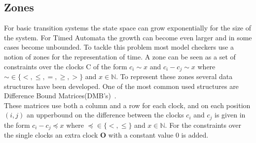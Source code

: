 \documentclass[11pt]{article}
\begin{document}
\subsection{Zones}
For basic transition systems the state space can grow exponentially for the size of the system. For Timed Automata the growth can become even larger and in some cases become unbounded. To tackle this problem most model checkers use a notion of zones for the representation of time. A zone can be seen as a set of constraints over the clocks C of the form $c_i \sim x$ and $c_i - c_j \sim x$ where $\sim  \in \{<, \leq, =, \geq, >\}$ and $x \in \mathbb{N}$. To represent these zones several data structures have been developed. One of the most common used structures are Difference Bound Matrices(DMB's)~\cite{bengtsson2002clocks}.\\ 
These matrices use both a column and a row for each clock, and on each position $(i,j)$ an upperbound on the difference between the clocks $c_i$ and $c_j$ is given in the form $c_i - c_j \preceq x$ where $\preceq \in \{<, \leq\}$ and $x \in \mathbb{N}$. For the constraints over the single clocks an extra clock $\mathbf{O}$ with a constant value 0 is added.

{}

\end{document}
